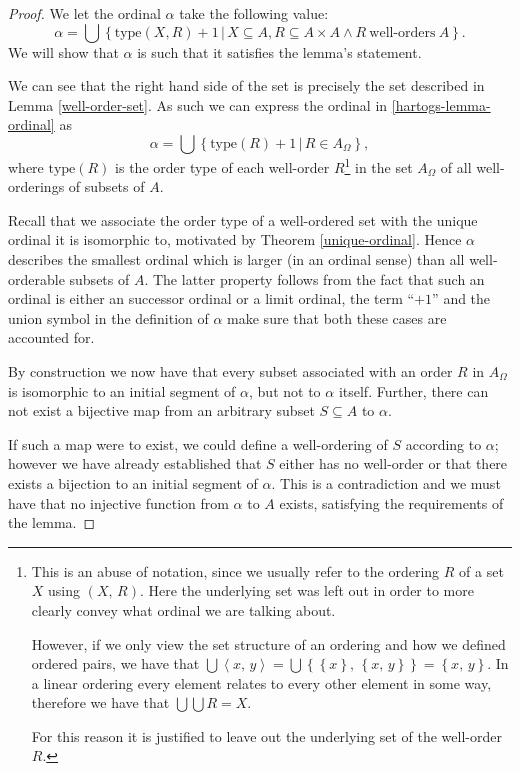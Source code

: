 \documentclass[../../main.tex]{subfiles}
\begin{document}
\begin{proof}
    We let the ordinal $\alpha$ take the following value:
    \begin{equation}\label{hartogs-lemma-ordinal}
        \alpha = \bigcup \left\{\text{type}\left(X, R\right) + 1 \,\vert\, X \subseteq A, R \subseteq A \times A \wedge R\ \text{well-orders}\ A\right\}.
    \end{equation}
    We will show that $\alpha$ is such that it satisfies the lemma's statement.

    We can see that the right hand side of the set is precisely the set described in Lemma \ref{well-order-set}.
    As such we can express the ordinal in \eqref{hartogs-lemma-ordinal} as
    $$\alpha = \bigcup \left\{\text{type}\left(R\right) + 1 \,\vert\, R \in A{_\Omega}\right\},$$
    where $\text{type}\left(R\right)$ is the order type of each well-order $R$\footnote{
        This is an abuse of notation, since we usually refer to the ordering $R$ of a set $X$ using $\left(X,\, R\right)$.
        Here the underlying set was left out in order to more clearly convey what ordinal we are talking about.

        However, if we only view the set structure of an ordering and how we defined ordered pairs,
        we have that $\bigcup \left<x,\, y\right> = \bigcup \left\{\left\{x\right\},\, \left\{x,\, y\right\}\right\} = \left\{x,\, y\right\}$.
        In a linear ordering every element relates to every other element in some way, therefore we have that $\bigcup \bigcup R = X$.

        For this reason it is justified to leave out the underlying set of the well-order $R$.
    }
    in the set $A_\Omega$ of all well-orderings of subsets of $A$.

    Recall that we associate the order type of a well-ordered set with the unique ordinal it is isomorphic to, motivated by Theorem \ref{unique-ordinal}.
    Hence $\alpha$ describes the smallest ordinal which is larger (in an ordinal sense) than all well-orderable subsets of $A$.
    The latter property follows from the fact that such an ordinal is either an successor ordinal or a limit ordinal, 
    the term ``$+1$'' and the union symbol in the definition of $\alpha$ make sure that both these cases are accounted for.

    By construction we now have that every subset associated with an order $R$ in $A_\Omega$ is isomorphic to an initial segment of $\alpha$, but not to $\alpha$ itself.
    Further, there can not exist a bijective map from an arbitrary subset $S \subseteq A$ to $\alpha$.
    
    If such a map were to exist, we could define a well-ordering of $S$ according to $\alpha$;
    however we have already established that $S$ either has no well-order or that there exists a bijection to an initial segment of $\alpha$.
    This is a contradiction and we must have that no injective function from $\alpha$ to $A$ exists, satisfying the requirements of the lemma.
\end{proof}
\end{document}
